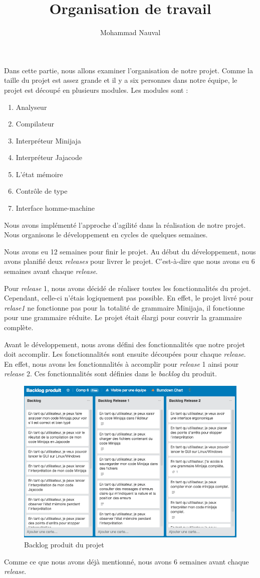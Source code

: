\documentclass[a4paper,12pt]{article}
\title{Organisation de travail}
\author{Mohammad Nauval}
\begin{document}
\maketitle

Dans cette partie, nous allons examiner l'organisation de notre projet. Comme la taille du projet est assez grande et il y a six personnes dans notre équipe, le projet est découpé en plusieurs modules. Les modules sont :

\begin{enumerate}
	\item Analyseur
	\item Compilateur
	\item Interpréteur Minijaja
	\item Interpréteur Jajacode
	\item L'état mémoire
	\item Contrôle de type
	\item Interface homme-machine
\end{enumerate}

Nous avons implémenté l'approche d'agilité dans la réalisation de notre projet. Nous organisons le développement en cycles de quelques semaines. 

Nous avons eu 12 semaines pour finir le projet. Au début du développement, nous avons planifié deux \textit{releases} pour livrer le projet. C'est-à-dire que nous avons eu 6 semaines avant chaque \textit{release}.  

Pour \textit{release} 1, nous avons décidé de réaliser toutes les fonctionnalités du projet. Cependant, celle-ci n'étais logiquement pas possible. En effet, le projet livré pour \textit{relase1} ne fonctionne pas pour la totalité de grammaire Minijaja, il fonctionne pour une grammaire réduite. Le projet était élargi pour couvrir la grammaire complète.

Avant le développement, nous avons défini des fonctionnalités que notre projet doit accomplir. Les fonctionnalités sont ensuite découpées pour chaque \textit{release}. En effet, nous avons les fonctionnalités à accomplir pour \textit{release} 1 ainsi pour \textit{release} 2. Ces fonctionnalités sont définies dans le \textit{backlog} du produit.

\begin{figure}[H]
\begin{center}
	\includegraphics[scale=0.3]{backlogproduit}
	\caption{Backlog produit du projet}
\end{center}
\end{figure}

Comme ce que nous avons déjà mentionné, nous avons 6 semaines avant chaque \textit{release}.
\end{document}
